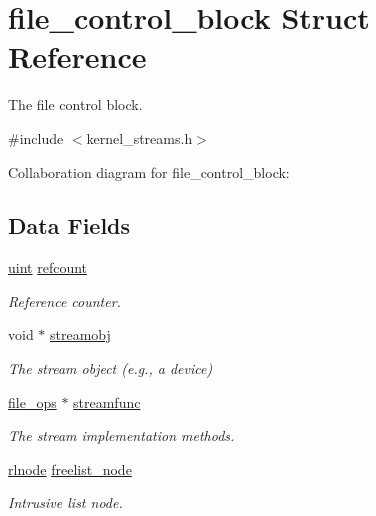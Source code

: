\hypertarget{structfile__control__block}{}\section{file\+\_\+control\+\_\+block Struct Reference}
\label{structfile__control__block}


The file control block.  




{\ttfamily \#include $<$kernel\+\_\+streams.\+h$>$}



Collaboration diagram for file\+\_\+control\+\_\+block\+:
\subsection*{Data Fields}
\begin{DoxyCompactItemize}
\item 
\mbox{\label{structfile__control__block_a629271d79f15500a74096ec65a4adedb}} 
\hyperlink{bios_8h_a91ad9478d81a7aaf2593e8d9c3d06a14}{uint} \hyperlink{structfile__control__block_a629271d79f15500a74096ec65a4adedb}{refcount}
\begin{DoxyCompactList}\small\item\em Reference counter. \end{DoxyCompactList}\item 
\mbox{\label{structfile__control__block_a1460eb54b4a65e747b9b9ec3f6a798d6}} 
void $\ast$ \hyperlink{structfile__control__block_a1460eb54b4a65e747b9b9ec3f6a798d6}{streamobj}
\begin{DoxyCompactList}\small\item\em The stream object (e.\+g., a device) \end{DoxyCompactList}\item 
\mbox{\label{structfile__control__block_aa49f26d3baceeb074fa00f9e5caf978b}} 
\hyperlink{group__dev_gaab625d8ae3a95e942ed10ed1579f5042}{file\+\_\+ops} $\ast$ \hyperlink{structfile__control__block_aa49f26d3baceeb074fa00f9e5caf978b}{streamfunc}
\begin{DoxyCompactList}\small\item\em The stream implementation methods. \end{DoxyCompactList}\item 
\mbox{\label{structfile__control__block_ac84640123f400fa3fe3cb64df08e6bd6}} 
\hyperlink{group__rlists_ga8f6244877f7ce2322c90525217ea6e7a}{rlnode} \hyperlink{structfile__control__block_ac84640123f400fa3fe3cb64df08e6bd6}{freelist\+\_\+node}
\begin{DoxyCompactList}\small\item\em Intrusive list node. \end{DoxyCompactList}\end{DoxyCompactItemize}


